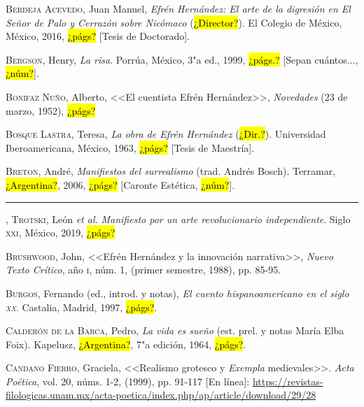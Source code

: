 \documentclass[14pt,twoside,final]{extbook} %
\begin{document}
\textsc{Berdeja Acevedo}, Juan Manuel, \emph{Efrén Hernández: El arte de la digresión en \emph{El Señor de Palo} y \emph{Cerrazón sobre Nicómaco}} (\hl{¿Director?}). El Colegio de México, México, 2016, \hl{¿págs?} [Tesis de Doctorado]. \label{bib:berdeja2016}

\textsc{Bergson}, Henry, \emph{La risa}. Porrúa, México, 3"a ed., 1999, \hl{¿págs.?} [Sepan cuántos..., \hl{¿núm?}].\label{bib:bergson1999}

\textsc{Bonifaz Nuño}, Alberto, <<El cuentista Efrén Hernández>>, \emph{Novedades} (23 de marzo, 1952), \hl{¿págs?}\label{bib:bonifaz1952}

\textsc{Bosque Lastra}, Teresa, \emph{La obra de Efrén Hernández} (\hl{¿Dir.?}). Universidad Iberoamericana, México, 1963, \hl{¿págs?} [Tesis de Maestría].\label{bib:bosque1963}

\textsc{Breton}, André, \emph{Manifiestos del surrealismo} (trad. Andrés Bosch). Terramar, \hl{¿Argentina?}, 2006, \hl{¿págs?} [Caronte Estética, \hl{¿núm?}].\label{bib:breton2006}

\rule{1cm}{0.4pt}, \textsc{Trotski}, León \emph{et al.} \emph{Manifiesto por un arte revolucionario independiente}. Siglo \textsc{xxi}, México, 2019, \hl{¿págs?}\label{bib:breton2019}

\textsc{Brushwood}, John, <<Efrén Hernández y la innovación narrativa>>, \emph{Nuevo Texto Crítico}, año \textsc{i}, núm. 1, (primer semestre, 1988), pp. 85-95.\label{bib:}

\textsc{Burgos}, Fernando (ed., introd. y notas), \emph{El cuento hispanoamericano en el siglo \textsc{xx}}. Castalia, Madrid, 1997, \hl{¿págs?}.\label{bib:burgos1997}

\textsc{Calderón de la Barca}, Pedro, \emph{La vida es sueño} (est. prel. y notas María Elba Foix). Kapelusz, \hl{¿Argentina?}, 7"a edición, 1964, \hl{¿págs?}.\label{bib:calderon1964}

\textsc{Candano Fierro}, Graciela, <<Realismo grotesco y \emph{Exempla} medievales>>. \emph{Acta Poética}, vol. 20, núms. 1-2, (1999), pp. 91-117 [En línea]: \href{https://revistas-filologicas.unam.mx/acta-poetica/index.php/ap/article/download/29/28}{https://revistas-filologicas.unam.mx/acta-poetica/index.php/ap/article/download/29/28}\label{bib:candano1999}
\end{document}
